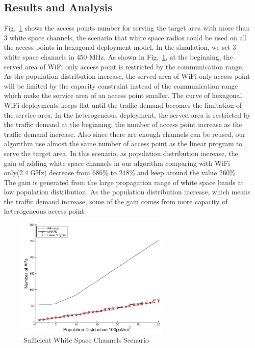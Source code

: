 \subsection{Results and Analysis} 
\label{subsec:result}

Fig.~\ref{fig:enoughchannels} shows the access points number for serving the target area with 
more than 3 white space channels, the scenario that white space radios could be used on all 
the access points in hexagonal deployment model. In the simulation, we set 3 white space channels
in 450 MHz. As shown in Fig.~\ref{fig:enoughchannels}, at the beginning, the served area of WiFi 
only access point is restricted by the communication range. As the population distribution increase, 
the served area of WiFi only access point will be limited by the capacity constraint instead 
of the communication range which make the service area of an access point smaller. The curve of 
hexagonal WiFi deployments keeps flat until the traffic demand becomes the limitation of the service
area. In the heterogeneous deployment, the served area is restricted by the traffic demand at 
the beginning, the number of access point increase as the traffic demand increase. Also since 
there are enough channels can be reused, our algorithm use almost the same number of access point 
as the linear program to serve the target area. In this scenario, as population distribution 
increase, the gain of adding white space channels in our algorithm comparing with WiFi only(2.4 GHz) 
decrease from 686\% to 248\% and keep around the value 260\%. The gain is generated from the large 
propagation range of white space bands at low population distribution. As the population distribution 
increase, which means the traffic demand increase, some of the gain comes from more capacity of 
heterogeneous access point.


\begin{figure}
\centering
\includegraphics[width=74mm]{figures/enoughchannels}
\vspace{-0.1in}
\caption{Sufficient White Space Channels Scenario}                                                                 
\label{fig:enoughchannels}
\vspace{-0.1in}
\end{figure}


